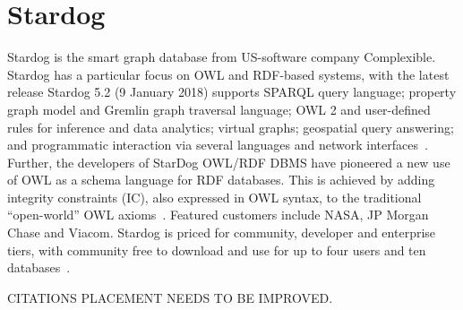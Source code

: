 \section{Stardog}
Stardog is the smart graph database from US-software company Complexible.
Stardog has a particular focus on OWL and RDF-based systems, with the latest
release Stardog 5.2 (9 January 2018) supports SPARQL query language; property
graph model and Gremlin graph traversal language; OWL 2 and user-defined rules
for inference and data analytics; virtual graphs; geospatial query answering;
and programmatic interaction via several languages and network interfaces~\cite{stardog-docs}.
 Further, the developers of StarDog OWL/RDF DBMS have
pioneered a new use of OWL as a schema language for RDF databases. This is
achieved by adding integrity constraints (IC), also expressed in OWL syntax,
to the traditional ``open-world'' OWL axioms~\cite{stardog-schema}. Featured
customers include NASA, JP Morgan Chase and Viacom. Stardog is priced for
community, developer and enterprise tiers, with community free to download
and use for up to four users and ten databases~\cite{stardog-computerword}.
 
 
CITATIONS PLACEMENT NEEDS TO BE IMPROVED.

